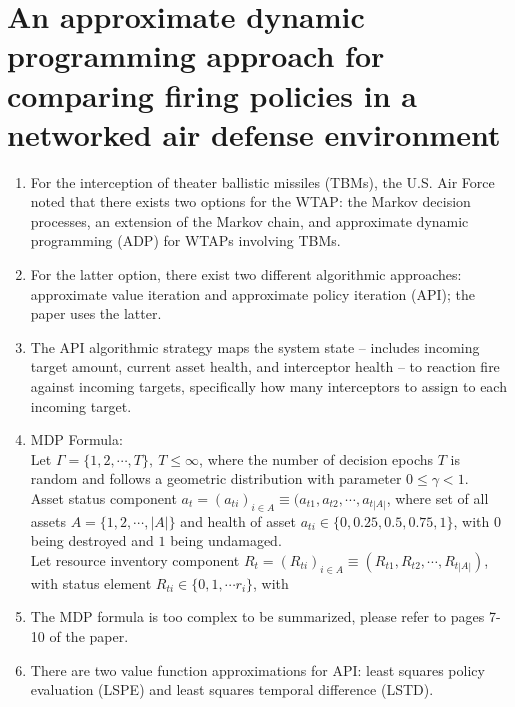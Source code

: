 \documentclass[12pt]{article} %
\renewcommand\le{\leqslant}
\begin{document}
\section*{An approximate dynamic programming approach for comparing firing policies in a networked air defense environment \cite{Summers2020AnAD}}
\begin{enumerate}
    \item For the interception of theater ballistic missiles (TBMs), the U.S. Air Force noted that there exists two options for the WTAP: the Markov decision processes, an extension of the Markov chain, and approximate dynamic programming (ADP) for WTAPs involving TBMs.
    \item For the latter option, there exist two different algorithmic approaches: approximate value iteration and approximate policy iteration (API); the paper uses the latter.
    \item The API algorithmic strategy maps the system state -- includes incoming target amount, current asset health, and interceptor health -- to reaction fire against incoming targets, specifically how many interceptors to assign to each incoming target.
    \item MDP Formula:\\
    Let $\Gamma = \{1, 2, \cdots, T\},\ T \le \infty$, where the number of decision epochs $T$ is random and follows a geometric distribution with parameter $0 \le \gamma < 1$. \\Asset status component $a_t = (a_{ti})_{i\in A}\equiv (a_{t1}, a_{t2}, \cdots, a_{t|A|}$, where set of all assets $A = \{1, 2, \cdots, |A|\}$ and health of asset $a_{ti} \in \{0, 0.25, 0.5, 0.75, 1\}$, with $0$ being destroyed and $1$ being undamaged. \\
    Let resource inventory component $R_t = (R_{ti})_{i\in A} \equiv (R_{t1}, R_{t2}, \cdots, R_{t|A|})$, with status element $R_{ti} \in \{0,1,\cdots r_i\}$, with
    \item The MDP formula is too complex to be summarized, please refer to pages 7-10 of the paper.
    \item There are two value function approximations for API: least squares policy evaluation (LSPE) and least squares temporal difference (LSTD).\\
    \vspace{-0.25cm}

\end{enumerate}
\end{document}

